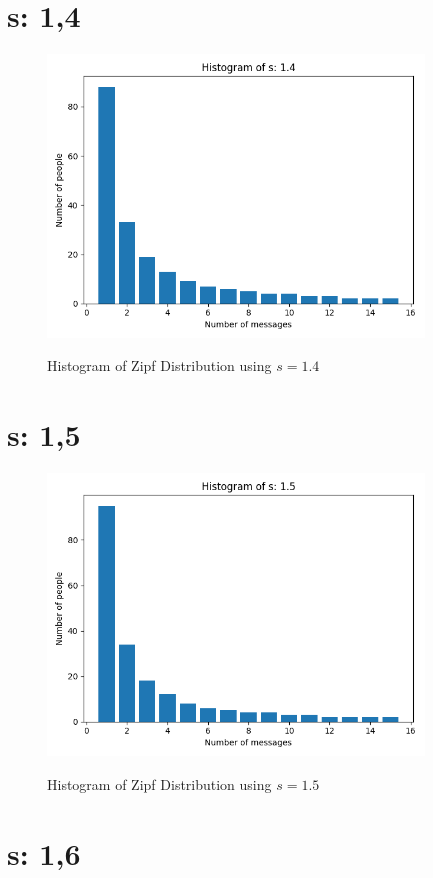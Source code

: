 \documentclass{article}
\begin{document}
\section{s: 1,4}
\begin{figure}[H] \centering
 \includegraphics[width=10cm]{imgs/histogram-14.png}
 \label{fig:hist-14}
 \caption{Histogram of Zipf Distribution using $s=1.4$} \end{figure}




\section{s: 1,5}
\begin{figure}[H] \centering
 \includegraphics[width=10cm]{imgs/histogram-15.png}
 \label{fig:hist-15}
 \caption{Histogram of Zipf Distribution using $s=1.5$} \end{figure}




\section{s: 1,6}
\end{document}
